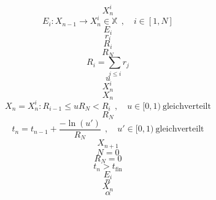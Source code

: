 \documentclass{scrreprt}
\begin{document}
\begin{equation}
X_n^i
\end{equation}
\begin{equation}
  E_i : X_{n-1} \rightarrow X_n^i \in \mathbb{X} ~~,\quad i \in [1, N]
\end{equation}
\begin{equation}
E_i
\end{equation}
\begin{equation}
r_i
\end{equation}
\begin{equation}
R_i
\end{equation}
\begin{equation}
R_N
\end{equation}
\begin{equation}
  R_i = \sum_{j \le i}{r_j}
\end{equation}
\begin{equation}
u
\end{equation}
\begin{equation}
X_n^i
\end{equation}
\begin{equation}
X_n
\end{equation}
\begin{equation}
  X_n = X_n^i : R_{i-1} \le u R_N < R_i ~~,\quad u \in [0,1)~\text{gleichverteilt}
\end{equation}
\begin{equation}
R_N
\end{equation}
\begin{equation}
  t_n = t_{n-1} + \frac{-\ln(u')}{R_N} ~~,\quad u' \in [0,1)~\text{gleichverteilt}
\end{equation}
\begin{equation}
X_{n+1}
\end{equation}
\begin{equation}
N=0
\end{equation}
\begin{equation}
R_N=0
\end{equation}
\begin{equation}
t_n > t_\text{fin}
\end{equation}
\begin{equation}
E_i
\end{equation}
\begin{equation}
n
\end{equation}
\begin{equation}
X_n
\end{equation}
\begin{equation}
\alpha
\end{equation}
\end{document}
